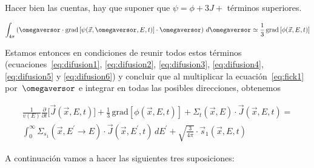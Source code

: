 {\color{red}Hacer bien las cuentas, hay que suponer que $\psi = \phi + 3J +$ términos superiores.}

\begin{equation}\label{eq:difusion6}
\int_{4\pi} \left( \omegaversor \cdot \text{grad} \left[ \psi(\vec{x}, \omegaversor, E, t) \right] \cdot  \omegaversor \right) \, d\omegaversor \simeq  \frac{1}{3}  \, \text{grad} \left[ \phi(\vec{x}, E,t ) \right]
\end{equation}


\medskip

Estamos entonces en condiciones de reunir todos estos términos (ecuaciones~\eqref{eq:difusion1}, \eqref{eq:difusion2}, \eqref{eq:difusion3}, \eqref{eq:difusion4}, \eqref{eq:difusion5} y \eqref{eq:difusion6}) y concluir que al multiplicar la ecuación~\eqref{eq:fick1} por~$\omegaversor$ e integrar en todas las posibles direcciones, obtenemos



\begin{multline}
\frac{1}{v(E)} \frac{\partial}{\partial t}\Big[ \vec{J}(\vec{x}, E, t) \Big] + 
\frac{1}{3}  \, \text{grad} \left[ \phi(\vec{x}, E,t ) \right] +
\Sigma_t(\vec{x}, E) \cdot \vec{J}(\vec{x}, E, t)
= \\
\int_0^\infty \Sigma_{s_1}(\vec{x},E^\prime \rightarrow E) \cdot \vec{J}(\vec{x}, E^\prime,t) \, dE^\prime +
\sqrt{\frac{3}{4\pi}} \cdot \vec{s}_1(\vec{x},E,t) \label{eq:fickinterm1}
\end{multline}

A continuación vamos a hacer las siguientes tres suposiciones:

